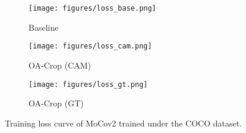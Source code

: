 \begin{figure}[h]
\centering\small
\begin{subfigure}{0.32\textwidth}
\texttt{[image: figures/loss\_base.png]}
\caption{Baseline}
\end{subfigure}
\begin{subfigure}{0.32\textwidth}
\texttt{[image: figures/loss\_cam.png]}
\caption{OA-Crop (CAM)}
\end{subfigure}
\begin{subfigure}{0.32\textwidth}
\texttt{[image: figures/loss\_gt.png]}
\caption{OA-Crop (GT)}
\end{subfigure}
\caption{
Training loss curve of MoCov2 trained under the COCO dataset.
}\label{fig:hard-loss}
\end{figure}
